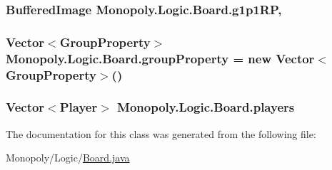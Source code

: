 \subsubsection[{\texorpdfstring{g1p1\+RP}{g1p1RP}}]{\setlength{\rightskip}{0pt plus 5cm}Buffered\+Image Monopoly.\+Logic.\+Board.\+g1p1\+RP\hspace{0.3cm}{\ttfamily [static]}, {\ttfamily [protected]}}\hypertarget{class_monopoly_1_1_logic_1_1_board_aaeeda9f5c80e5ed76e67289cb3f22ea7}{}\label{class_monopoly_1_1_logic_1_1_board_aaeeda9f5c80e5ed76e67289cb3f22ea7}
\subsubsection[{\texorpdfstring{group\+Property}{groupProperty}}]{\setlength{\rightskip}{0pt plus 5cm}Vector$<${\bf Group\+Property}$>$ Monopoly.\+Logic.\+Board.\+group\+Property = new Vector$<${\bf Group\+Property}$>$()\hspace{0.3cm}{\ttfamily [private]}}\hypertarget{class_monopoly_1_1_logic_1_1_board_a6861185113e9efbff62d0c02ad1aafad}{}\label{class_monopoly_1_1_logic_1_1_board_a6861185113e9efbff62d0c02ad1aafad}
\subsubsection[{\texorpdfstring{players}{players}}]{\setlength{\rightskip}{0pt plus 5cm}Vector$<${\bf Player}$>$ Monopoly.\+Logic.\+Board.\+players\hspace{0.3cm}{\ttfamily [private]}}\hypertarget{class_monopoly_1_1_logic_1_1_board_ae0af8df9bdefdb9dad582cab0abd1abe}{}\label{class_monopoly_1_1_logic_1_1_board_ae0af8df9bdefdb9dad582cab0abd1abe}


The documentation for this class was generated from the following file\+:\begin{DoxyCompactItemize}
\item 
Monopoly/\+Logic/\hyperlink{_board_8java}{Board.\+java}\end{DoxyCompactItemize}
